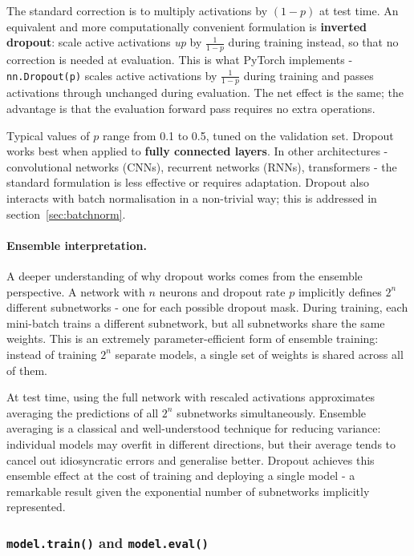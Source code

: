 The standard correction is to multiply activations by $(1-p)$ at test time. An equivalent and more computationally convenient formulation is \textbf{inverted dropout}: scale active activations \emph{up} by $\frac{1}{1-p}$ during training instead, so that no correction is needed at evaluation. This is what PyTorch implements - \texttt{nn.Dropout(p)} scales active activations by $\frac{1}{1-p}$ during training and passes activations through unchanged during evaluation. The net effect is the same; the advantage is that the evaluation forward pass requires no extra operations.

Typical values of $p$ range from 0.1 to 0.5, tuned on the validation set. Dropout works best when applied to \textbf{fully connected layers}. In other architectures - convolutional networks (CNNs), recurrent networks (RNNs), transformers - the standard formulation is less effective or requires adaptation. Dropout also interacts with batch normalisation in a non-trivial way; this is addressed in section~\ref{sec:batchnorm}.

\paragraph{Ensemble interpretation.}
A deeper understanding of why dropout works comes from the ensemble perspective. A network with $n$ neurons and dropout rate $p$ implicitly defines $2^n$ different subnetworks - one for each possible dropout mask. During training, each mini-batch trains a different subnetwork, but all subnetworks share the same weights. This is an extremely parameter-efficient form of ensemble training: instead of training $2^n$ separate models, a single set of weights is shared across all of them.

At test time, using the full network with rescaled activations approximates averaging the predictions of all $2^n$ subnetworks simultaneously. Ensemble averaging is a classical and well-understood technique for reducing variance: individual models may overfit in different directions, but their average tends to cancel out idiosyncratic errors and generalise better. Dropout achieves this ensemble effect at the cost of training and deploying a single model - a remarkable result given the exponential number of subnetworks implicitly represented.

\subsubsection{\texttt{model.train()} and \texttt{model.eval()}}

